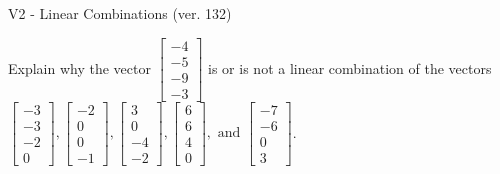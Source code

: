 \begin{exercise}
  \begin{exerciseTitle}V2 - Linear Combinations (ver. 132)\end{exerciseTitle}
  \begin{exerciseStatement}
    Explain why the vector \(\left[\begin{array}{c}
-4 \\
-5 \\
-9 \\
-3
\end{array}\right]\)  is or is not a linear 
	combination of the vectors \(\left[\begin{array}{c}
-3 \\
-3 \\
-2 \\
0
\end{array}\right] , \left[\begin{array}{c}
-2 \\
0 \\
0 \\
-1
\end{array}\right] , \left[\begin{array}{c}
3 \\
0 \\
-4 \\
-2
\end{array}\right] , \left[\begin{array}{c}
6 \\
6 \\
4 \\
0
\end{array}\right] , \text{ and } \left[\begin{array}{c}
-7 \\
-6 \\
0 \\
3
\end{array}\right]\).
	



\end{exerciseStatement}
\end{exercise}
